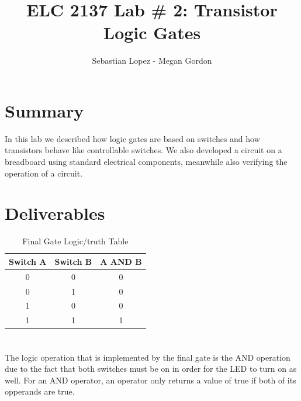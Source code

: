 \documentclass[11pt]{article}
\begin{document}
\title{ELC 2137 Lab \# 2: Transistor Logic Gates}
\author{Sebastian Lopez - Megan Gordon}

\maketitle


\section*{Summary}

In this lab we described how logic gates are based on switches and how transistors behave like controllable switches. We also developed a circuit on a breadboard using standard electrical components, meanwhile also verifying the operation of a circuit.  

\section*{Deliverables}


	\begin{table}[ht]\centering
		\caption{Final Gate Logic/truth Table}
		\label{tbl:Logic_Truth_Table}
		\begin{tabular}{cc|c}
			\toprule
			Switch A & Switch B & A AND B \\
			\midrule
			0 & 0 & 0 \\
			0 & 1 & 0 \\
			1 & 0 & 0 \\
			1 & 1 & 1 \\
			\bottomrule
		\end{tabular} 
	\end{table} 
\section*{}

The logic operation that is implemented by the final gate is the AND operation due to the fact that both switches must be on in order for the LED to turn on as well. For an AND operator, an operator only returns a value of true if both of its opperands are true.  
	
\end{document}
